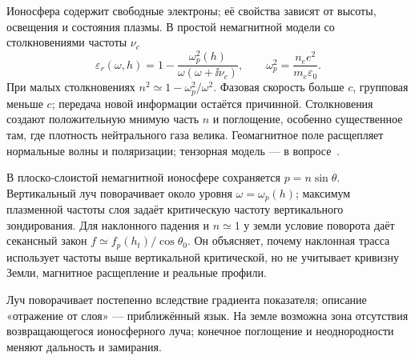
Ионосфера содержит свободные электроны; её свойства зависят от высоты, освещения и состояния плазмы. В простой немагнитной модели со столкновениями частоты $\nu_c$
\begin{equation}
 \varepsilon_r(\omega,h)=1-\frac{\omega_p^2(h)}{\omega(\omega+\ii\nu_c)},
 \qquad \omega_p^2=\frac{n_ee^2}{m_e\varepsilon_0}.
\end{equation}
При малых столкновениях $n^2\simeq1-\omega_p^2/\omega^2$. Фазовая скорость больше $c$, групповая меньше $c$; передача новой информации остаётся причинной. Столкновения создают положительную мнимую часть $n$ и поглощение, особенно существенное там, где плотность нейтрального газа велика. Геомагнитное поле расщепляет нормальные волны и поляризации; тензорная модель — в вопросе~.

В плоско-слоистой немагнитной ионосфере сохраняется $p=n\sin\theta$. Вертикальный луч поворачивает около уровня $\omega=\omega_p(h)$; максимум плазменной частоты слоя задаёт критическую частоту вертикального зондирования. Для наклонного падения и $n\simeq1$ у земли условие поворота даёт секансный закон $f\simeq f_p(h_t)/\cos\theta_0$. Он объясняет, почему наклонная трасса использует частоты выше вертикальной критической, но не учитывает кривизну Земли, магнитное расщепление и реальные профили.

Луч поворачивает постепенно вследствие градиента показателя; описание «отражение от слоя» — приближённый язык. На земле возможна зона отсутствия возвращающегося ионосферного луча; конечное поглощение и неоднородности меняют дальность и замирания.
